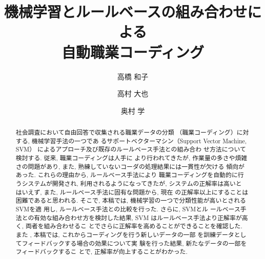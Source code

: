 \documentclass{nlp}
\begin{document}
\setcounter{page}{1}
\setcounter{Volume}{1}
\setcounter{Number}{1}
\setcounter{Year}{2004} 
\setcounter{Month}{1}

\title{機械学習とルールベースの組み合わせによる\\自動職業コーディング}
\author{高橋 和子 \and 高村 大也
 \and 奥村 学}



\begin{abstract}
社会調査において自由回答で収集される職業データの分類
（職業コーディング）に対する, 機械学習手法の一つであ
るサポートベクターマシン（Support Vector Machine, SVM）
によるアプローチ及び既存のルールベース手法との組み合わ
せ方法について検討する. 従来, 職業コーディングは人手に
より行われてきたが, 作業量の多さや煩雑さの問題があり, 
また, 熟練していないコーダの処理結果には一貫性が欠ける
傾向があった. これらの理由から, ルールベース手法により
職業コーディングを自動的に行うシステムが開発され, 
利用されるようになってきたが, システムの正解率は高いと
はいえず, また, ルールベース手法に固有な問題から, 現在
の正解率以上にすることは困難であると思われる. そこで, 
本稿では, 機械学習の一つで分類性能が高いとされるSVMを適
用し, ルールベース手法との比較を行った. さらに, SVMとル
ールベース手法との有効な組み合わせ方を検討した結果, SVM
はルールベース手法より正解率が高く, 両者を組み合わせるこ
とでさらに正解率を高めることができることを確認した. また
, 本稿では, これからコーディングを行う新しいデータの一部
を訓練データとしてフィードバックする場合の効果について実
験を行った結果, 新たなデータの一部をフィードバックするこ
とで, 正解率が向上することがわかった. \\ 
\end{abstract}


\end{document}
